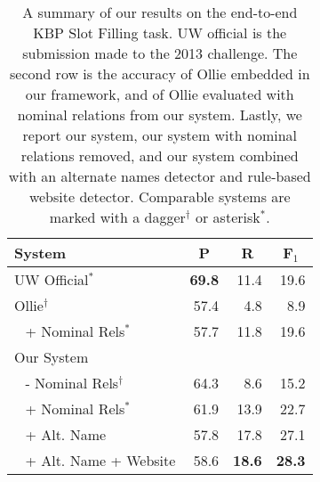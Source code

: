 \begin{table}
\begin{center}
\begin{tabular}{lrrr}
\hline
\textbf{System}                & \multicolumn{1}{c}{\textbf{P}}    
                               & \multicolumn{1}{c}{\textbf{R}}    
                               & \multicolumn{1}{c}{\textbf{F$_1$}} \\
\hline
UW Official$^*$                & \textbf{69.8} & 11.4          & 19.6 \\
\hline
Ollie$^\dagger$                & 57.4          & 4.8           & 8.9  \\
$~~$ + Nominal Rels$^*$        & 57.7          & 11.8          & 19.6 \\
\hline
Our System                     & ~~~~          & ~~~           & ~~~  \\
$~~$ - Nominal Rels$^\dagger$  & 64.3          & 8.6           & 15.2 \\
$~~$ + Nominal Rels$^*$        & 61.9          & 13.9          & 22.7 \\
$~~$ + Alt. Name               & 57.8          & 17.8          & 27.1 \\
$~~$ + Alt. Name + Website     & 58.6          & \textbf{18.6} & \textbf{28.3} \\
\hline
\end{tabular}
\end{center}
\caption{\label{tab:results}
A summary of our results on the end-to-end KBP Slot Filling task.
UW official is the submission made to the 2013 challenge.
The second row is the accuracy of Ollie embedded in our framework,
  and of Ollie evaluated with nominal relations from our system.
Lastly, we report our system, our system with nominal relations removed,
  and our system combined with an alternate names detector and rule-based
  website detector.
Comparable systems are marked with a dagger$^\dagger$ or  asterisk$^*$.
}
\end{table}


